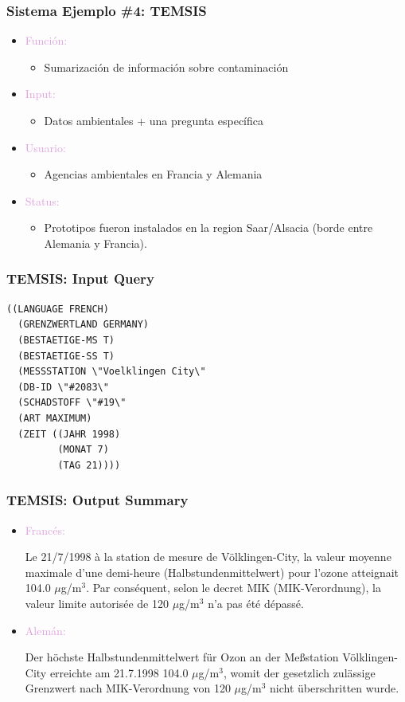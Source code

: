 \documentclass[compress,color=usenames]{beamer}
\newcommand{\mH}[1]{\textcolor{Plum}{#1}}
\begin{document}
\begin{frame}
\frametitle{Sistema Ejemplo \#4: TEMSIS}

\begin{itemize}
\item \mH{Funci\'on: }
\begin{itemize}
\item Sumarizaci\'on de informaci\'on sobre contaminaci\'on
\end{itemize}
\item \mH{Input: }
\begin{itemize}
\item Datos ambientales + una pregunta espec\'ifica
\end{itemize}
\item \mH{Usuario: }
\begin{itemize}
\item Agencias ambientales en Francia y Alemania
\end{itemize}
\item \mH{Status: }
\begin{itemize}
\item Prototipos fueron instalados en la region Saar/Alsacia (borde entre Alemania y Francia). 
\end{itemize}
\end{itemize}

\end{frame}

\begin{frame}[fragile]
\frametitle{TEMSIS: Input Query}

\begin{verbatim}
((LANGUAGE FRENCH)
  (GRENZWERTLAND GERMANY)
  (BESTAETIGE-MS T)
  (BESTAETIGE-SS T) 
  (MESSSTATION \"Voelklingen City\"
  (DB-ID \"#2083\"
  (SCHADSTOFF \"#19\"
  (ART MAXIMUM)
  (ZEIT ((JAHR 1998)
         (MONAT 7)
         (TAG 21))))
\end{verbatim}

\end{frame}

\begin{frame}
\frametitle{TEMSIS: Output Summary}

\begin{itemize}
\item \mH{Franc\'es:}

Le 21/7/1998 \`a la station de mesure de V\"olklingen-City, la valeur moyenne maximale d'une demi-heure (Halbstundenmittelwert) pour l'ozone atteignait 104.0 $\mu$g/m${}^3$. Par cons\'equent, selon le decret MIK (MIK-Verordnung), la valeur limite autoris\'ee de 120 $\mu$g/m${}^3$ n'a pas \'et\'e d\'epass\'e.

\item \mH{Alem\'an:}

Der h\"ochste Halbstundenmittelwert f\"ur Ozon an der Me{\ss}station V\"olklingen-City erreichte 
am 21.7.1998 104.0 $\mu$g/m${}^3$, womit der gesetzlich zul\"assige Grenzwert nach MIK-Verordnung von 
120 $\mu$g/m${}^3$ nicht \"uberschritten wurde.
\end{itemize}

\end{frame}
\end{document}
